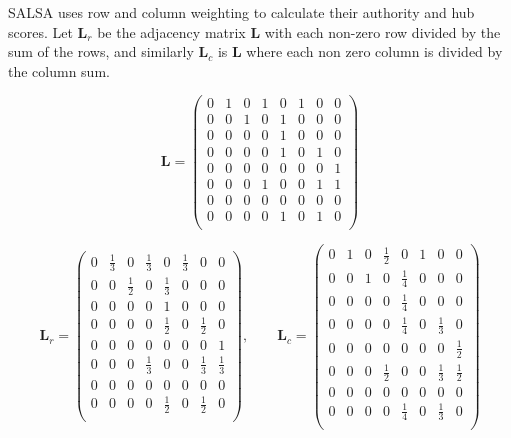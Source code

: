 \documentclass[11pt]{report}
\begin{document}
{SALSA uses row and column weighting to calculate their authority and hub scores. Let $\textbf{L}_r$ be the adjacency matrix \textbf{L} with each non-zero row divided by the sum of the rows, and similarly $\textbf{L}_c$ is \textbf{L} where each non zero column is divided by the column sum.

\begin{equation*}
\textbf{L}=\left(
\begin{array}{cccccccc}
0 & 1 & 0 & 1 & 0 & 1 & 0 & 0 \\
0 & 0 & 1 & 0 & 1 & 0 & 0 & 0 \\
0 & 0 & 0 & 0 & 1 & 0 & 0 & 0 \\
0 & 0 & 0 & 0 & 1 & 0 & 1 & 0 \\
0 & 0 & 0 & 0 & 0 & 0 & 0 & 1 \\
0 & 0 & 0 & 1 & 0 & 0 & 1 & 1 \\
0 & 0 & 0 & 0 & 0 & 0 & 0 & 0 \\
0 & 0 & 0 & 0 & 1 & 0 & 1 & 0 \\
\end{array}
\right)
\end{equation*}

\begin{equation*} \renewcommand*{\arraystretch}{1.25}
\textbf{L}_r=\left(
\begin{array}{cccccccc}
0 & \frac{1}{3} & 0 & \frac{1}{3} & 0 & \frac{1}{3} & 0 & 0 \\
0 & 0 & \frac{1}{2} & 0 & \frac{1}{3} & 0 & 0 & 0 \\
0 & 0 & 0 & 0 & 1 & 0 & 0 & 0\\
0 & 0 & 0 & 0 & \frac{1}{2} & 0 & \frac{1}{2} & 0 \\
0 & 0 & 0 & 0 & 0 & 0 & 0 & 1 \\
0 & 0 & 0 & \frac{1}{3} & 0 & 0 & \frac{1}{3} & \frac{1}{3} \\
0 & 0 & 0 & 0 & 0 & 0 & 0 & 0 \\
0 & 0 & 0 & 0 & \frac{1}{2} & 0 & \frac{1}{2} & 0 \\
\end{array}
\right)
\mathrm{,}\qquad
\textbf{L}_c=\left(
\begin{array}{cccccccc} 
0 & 1 & 0 & \frac{1}{2} & 0 & 1 & 0 & 0 \\
0 & 0 & 1 & 0 & \frac{1}{4} & 0 & 0 & 0 \\
0 & 0 & 0 & 0 & \frac{1}{4} & 0 & 0 & 0 \\
0 & 0 & 0 & 0 & \frac{1}{4} & 0 & \frac{1}{3} & 0 \\
0 & 0 & 0 & 0 & 0 & 0 & 0 & \frac{1}{2} \\
0 & 0 & 0 & \frac{1}{2} & 0 & 0 & \frac{1}{3} & \frac{1}{2} \\
0 & 0 & 0 & 0 & 0 & 0 & 0 & 0 \\
0 & 0 & 0 & 0 & \frac{1}{4} & 0 & \frac{1}{3} & 0 \\
\end{array}
\right)
\end{equation*}

}
\end{document}
